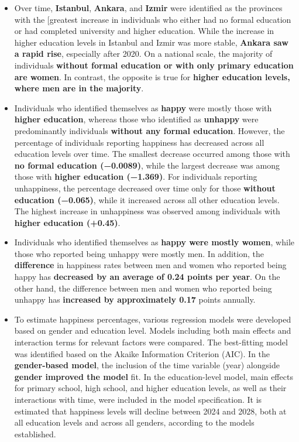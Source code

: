 \documentclass[
  11pt,
  a4paper,
  DIV=11,
  numbers=noendperiod]{scrartcl}
\begin{document}
\begin{itemize}
\item
  Over time, {\textbf{Istanbul}}, {\textbf{Ankara}}, and
  {\textbf{Izmir}} were identified as the provinces with the {[}greatest
  increase in individuals who either had no formal education or had
  completed university and higher education. While the increase in
  higher education levels in Istanbul and Izmir was more stable,
  {\textbf{Ankara saw a rapid rise}}, especially after 2020. On a
  national scale, the majority of individuals {\textbf{without formal
  education or with only primary education are women}}. In contrast, the
  opposite is true for {\textbf{higher education levels, where men are
  in the majority}}.
\item
  Individuals who identified themselves as {\textbf{happy}} were mostly
  those with {\textbf{higher education}}, whereas those who identified
  as {\textbf{unhappy}} were predominantly individuals {\textbf{without
  any formal education}}. However, the percentage of individuals
  reporting happiness has decreased across all education levels over
  time. The smallest decrease occurred among those with {\textbf{no
  formal education (−0.0089)}}, while the largest decrease was among
  those with {\textbf{higher education (−1.369)}}. For individuals
  reporting unhappiness, the percentage decreased over time only for
  those {\textbf{without education (−0.065)}}, while it increased across
  all other education levels. The highest increase in unhappiness was
  observed among individuals with {\textbf{higher education (+0.45)}}.
\item
  Individuals who identified themselves as {\textbf{happy were mostly
  women}}, while those who reported being unhappy were mostly men. In
  addition, the {\textbf{difference}} in happiness rates between men and
  women who reported being happy has {\textbf{decreased by an average of
  0.24 points per year}}. On the other hand, the difference between men
  and women who reported being unhappy has {\textbf{increased by
  approximately 0.17}} points annually.
\item
  To estimate happiness percentages, various regression models were
  developed based on gender and education level. Models including both
  main effects and interaction terms for relevant factors were compared.
  The best-fitting model was identified based on the Akaike Information
  Criterion (AIC). In the {\textbf{gender-based model}}, the inclusion
  of the time variable (year) alongside {\textbf{gender improved the
  model}} fit. In the education-level model, main effects for primary
  school, high school, and higher education levels, as well as their
  interactions with time, were included in the model specification. It
  is estimated that happiness levels will decline between 2024 and 2028,
  both at all education levels and across all genders, according to the
  models established.
\end{itemize}
\end{document}
